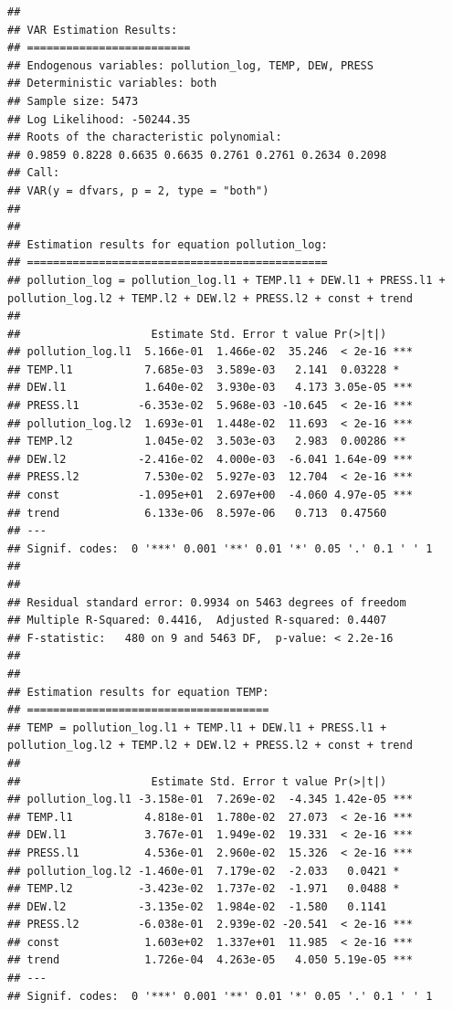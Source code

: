\documentclass[
]{article}
\begin{document}
\begin{verbatim}
## 
## VAR Estimation Results:
## ========================= 
## Endogenous variables: pollution_log, TEMP, DEW, PRESS 
## Deterministic variables: both 
## Sample size: 5473 
## Log Likelihood: -50244.35 
## Roots of the characteristic polynomial:
## 0.9859 0.8228 0.6635 0.6635 0.2761 0.2761 0.2634 0.2098
## Call:
## VAR(y = dfvars, p = 2, type = "both")
## 
## 
## Estimation results for equation pollution_log: 
## ============================================== 
## pollution_log = pollution_log.l1 + TEMP.l1 + DEW.l1 + PRESS.l1 + pollution_log.l2 + TEMP.l2 + DEW.l2 + PRESS.l2 + const + trend 
## 
##                    Estimate Std. Error t value Pr(>|t|)    
## pollution_log.l1  5.166e-01  1.466e-02  35.246  < 2e-16 ***
## TEMP.l1           7.685e-03  3.589e-03   2.141  0.03228 *  
## DEW.l1            1.640e-02  3.930e-03   4.173 3.05e-05 ***
## PRESS.l1         -6.353e-02  5.968e-03 -10.645  < 2e-16 ***
## pollution_log.l2  1.693e-01  1.448e-02  11.693  < 2e-16 ***
## TEMP.l2           1.045e-02  3.503e-03   2.983  0.00286 ** 
## DEW.l2           -2.416e-02  4.000e-03  -6.041 1.64e-09 ***
## PRESS.l2          7.530e-02  5.927e-03  12.704  < 2e-16 ***
## const            -1.095e+01  2.697e+00  -4.060 4.97e-05 ***
## trend             6.133e-06  8.597e-06   0.713  0.47560    
## ---
## Signif. codes:  0 '***' 0.001 '**' 0.01 '*' 0.05 '.' 0.1 ' ' 1
## 
## 
## Residual standard error: 0.9934 on 5463 degrees of freedom
## Multiple R-Squared: 0.4416,  Adjusted R-squared: 0.4407 
## F-statistic:   480 on 9 and 5463 DF,  p-value: < 2.2e-16 
## 
## 
## Estimation results for equation TEMP: 
## ===================================== 
## TEMP = pollution_log.l1 + TEMP.l1 + DEW.l1 + PRESS.l1 + pollution_log.l2 + TEMP.l2 + DEW.l2 + PRESS.l2 + const + trend 
## 
##                    Estimate Std. Error t value Pr(>|t|)    
## pollution_log.l1 -3.158e-01  7.269e-02  -4.345 1.42e-05 ***
## TEMP.l1           4.818e-01  1.780e-02  27.073  < 2e-16 ***
## DEW.l1            3.767e-01  1.949e-02  19.331  < 2e-16 ***
## PRESS.l1          4.536e-01  2.960e-02  15.326  < 2e-16 ***
## pollution_log.l2 -1.460e-01  7.179e-02  -2.033   0.0421 *  
## TEMP.l2          -3.423e-02  1.737e-02  -1.971   0.0488 *  
## DEW.l2           -3.135e-02  1.984e-02  -1.580   0.1141    
## PRESS.l2         -6.038e-01  2.939e-02 -20.541  < 2e-16 ***
## const             1.603e+02  1.337e+01  11.985  < 2e-16 ***
## trend             1.726e-04  4.263e-05   4.050 5.19e-05 ***
## ---
## Signif. codes:  0 '***' 0.001 '**' 0.01 '*' 0.05 '.' 0.1 ' ' 1

\end{verbatim}
\end{document}
